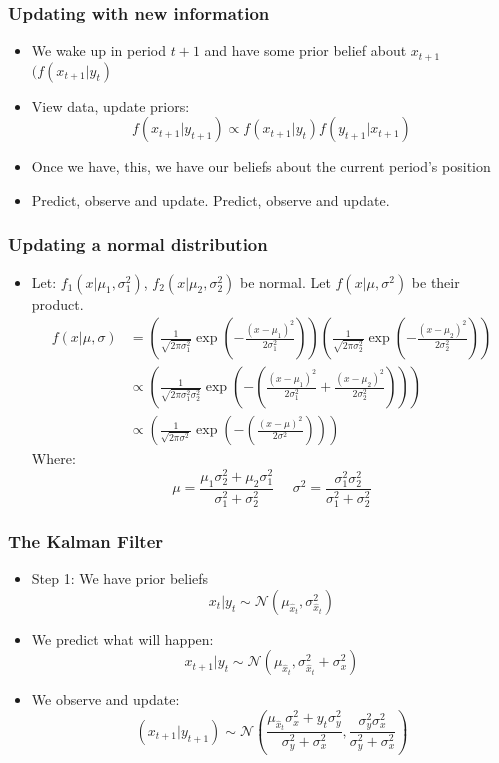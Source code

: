 \begin{frame}
\frametitle[alignment=center]{Updating with new information}
\begin{itemize}
\item We wake up in period $t+1$ and have some prior belief about $x_{t+1}$ $(f(x_{t+1}|y_t)$
\bigskip
\item View data, update priors:
$$f(x_{t+1}|y_{t+1})\propto f(x_{t+1}|y_t)f(y_{t+1}|x_{t+1})$$
\item Once we have, this, we have our beliefs about the current period's position
\bigskip
\item Predict, observe and update.  Predict, observe and update.
\end{itemize}
\end{frame}

\begin{frame}
\frametitle[alignment=center]{Updating a normal distribution}
\begin{itemize}
\item Let:  $f_1(x|\mu_1,\sigma_1^2)$, $f_2(x|\mu_2,\sigma_2^2)$ be normal.  Let $f(x|\mu,\sigma^2)$ be their product.
\scriptsize
\begin{align*}f(x|\mu,\sigma) & =\left(\frac{1}{\sqrt{2\pi\sigma_1^2}}\exp\left(-\frac{(x-\mu_1)^2}{2\sigma_1^2}\right)\right)\left(\frac{1}{\sqrt{2\pi\sigma_2^2}}\exp\left(-\frac{(x-\mu_2)^2}{2\sigma_2^2}\right)\right) \\
 & \propto \left(\frac{1}{\sqrt{2\pi\sigma_1^2\sigma_2^2}}\exp\left(-\left(\frac{(x-\mu_1)^2}{2\sigma_1^2}+\frac{(x-\mu_2)^2}{2\sigma_2^2}\right)\right)\right)\\
  & \propto \left(\frac{1}{\sqrt{2\pi\sigma^2}}\exp\left(-\left(\frac{(x-\mu)^2}{2\sigma^2}\right)\right)\right) \end{align*}
  Where:
  $$\mu=\frac{\mu_1\sigma_2^2+\mu_2\sigma_1^2}{\sigma_1^2+\sigma_2^2}\ \ \ \ \ \ \sigma^2=\frac{\sigma_1^2\sigma_2^2}{\sigma_1^2+\sigma_2^2}$$
\end{itemize}
\end{frame}


\begin{frame}
\frametitle[alignment=center]{The Kalman Filter}
\begin{itemize}
\item Step 1: We have prior beliefs
$$x_t|y_t\sim\mathcal{N}\left(\mu_{\hat{x}_t},\sigma_{\hat{x}_t}^2\right)$$
\bigskip
\item We predict what will happen:
$$x_{t+1}|y_t\sim\mathcal{N}\left(\mu_{\hat{x}_t},\sigma_{\hat{x}_t}^2+\sigma_{x}^2\right)$$
\item We observe and update:
$$(x_{t+1}|y_{t+1})\sim\mathcal{N}\left(\frac{\mu_{\hat{x}_t}\sigma_x^2+y_t\sigma_y^2}{\sigma_y^2+\sigma_x^2},\frac{\sigma_y^2\sigma_x^2}{\sigma_y^2+\sigma_x^2}\right)$$
\end{itemize}
\end{frame}

